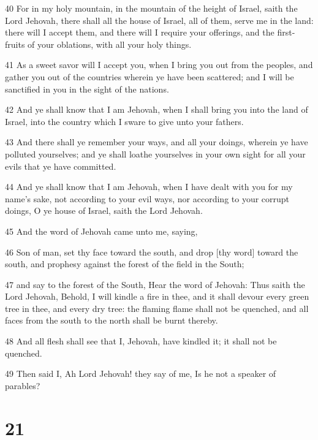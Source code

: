 \par 40 For in my holy mountain, in the mountain of the height of Israel, saith the Lord Jehovah, there shall all the house of Israel, all of them, serve me in the land: there will I accept them, and there will I require your offerings, and the first-fruits of your oblations, with all your holy things.
\par 41 As a sweet savor will I accept you, when I bring you out from the peoples, and gather you out of the countries wherein ye have been scattered; and I will be sanctified in you in the sight of the nations.
\par 42 And ye shall know that I am Jehovah, when I shall bring you into the land of Israel, into the country which I sware to give unto your fathers.
\par 43 And there shall ye remember your ways, and all your doings, wherein ye have polluted yourselves; and ye shall loathe yourselves in your own sight for all your evils that ye have committed.
\par 44 And ye shall know that I am Jehovah, when I have dealt with you for my name's sake, not according to your evil ways, nor according to your corrupt doings, O ye house of Israel, saith the Lord Jehovah.
\par 45 And the word of Jehovah came unto me, saying,
\par 46 Son of man, set thy face toward the south, and drop [thy word] toward the south, and prophesy against the forest of the field in the South;
\par 47 and say to the forest of the South, Hear the word of Jehovah: Thus saith the Lord Jehovah, Behold, I will kindle a fire in thee, and it shall devour every green tree in thee, and every dry tree: the flaming flame shall not be quenched, and all faces from the south to the north shall be burnt thereby.
\par 48 And all flesh shall see that I, Jehovah, have kindled it; it shall not be quenched.
\par 49 Then said I, Ah Lord Jehovah! they say of me, Is he not a speaker of parables?

\chapter{21}

